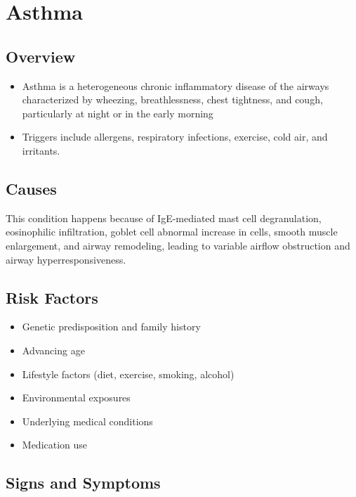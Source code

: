 \chapter{Asthma}
\label{sec:Asthma}

\section{Overview}


\begin{itemize}[noitemsep]
  \item Asthma is a heterogeneous chronic inflammatory disease of the airways characterized by wheezing, breathlessness, chest tightness, and cough, particularly at night or in the early morning
  \item Triggers include allergens, respiratory infections, exercise, cold air, and irritants.
\end{itemize}
\section{Causes}
This condition happens because of IgE-mediated mast cell degranulation, eosinophilic infiltration, goblet cell abnormal increase in cells, smooth muscle enlargement, and airway remodeling, leading to variable airflow obstruction and airway hyperresponsiveness.     
\section{Risk Factors}

\begin{itemize}[noitemsep]
  \item Genetic predisposition and family history
  \item Advancing age
  \item Lifestyle factors (diet, exercise, smoking, alcohol)
  \item Environmental exposures
  \item Underlying medical conditions
  \item Medication use
\end{itemize}
\section{Signs and Symptoms}

